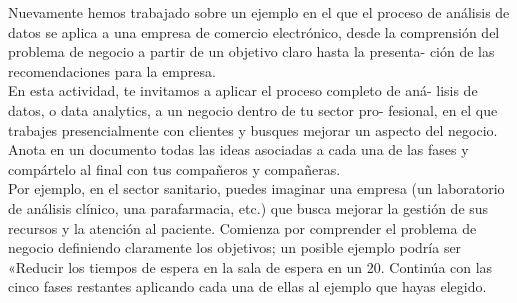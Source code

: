 {
	Nuevamente hemos trabajado sobre un ejemplo en el que el proceso de análisis de datos se aplica a una empresa de comercio
	electrónico, desde la comprensión del problema de negocio a partir de un objetivo claro hasta la presenta- ción de las
	recomendaciones para la empresa.\\

	En esta actividad, te invitamos a aplicar el proceso completo de aná- lisis de datos, o
	data analytics, a un negocio dentro de tu sector pro- fesional, en el que trabajes presencialmente con clientes y busques
	mejorar un aspecto del negocio. Anota en un documento todas las ideas asociadas a cada una de las fases y compártelo al final
	con tus compañeros y compañeras.\\

	Por ejemplo, en el sector sanitario, puedes imaginar una empresa (un laboratorio de análisis
	clínico, una parafarmacia, etc.) que busca mejorar la gestión de sus recursos y la atención al paciente. Comienza por
	comprender el problema de negocio definiendo claramente los objetivos; un posible ejemplo podría ser «Reducir los tiempos de
	espera en la sala de espera en un 20.
	Continúa con las cinco fases restantes aplicando cada una de ellas al ejemplo que hayas elegido.
}\\


